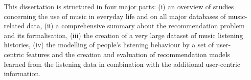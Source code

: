 













This dissertation is structured in four major parts: (i) an overview of studies concerning the use of music in everyday life and on all major databases of music-related data, (ii) a comprehensive summary about the recommendation problem and its formalisation, (iii) the creation of a very large dataset of music listening histories, (iv) the modelling of people's listening behaviour by a set of user-centric features and the creation and evaluation of recommendation models learned from the listening data in combination with the additional user-centric information.

